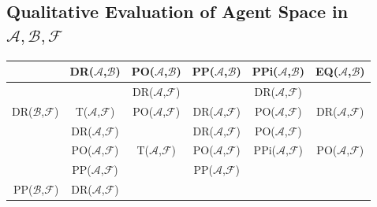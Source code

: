 \documentclass[runningheads]{llncs}
\newcommand{\assertionRegion}{\mathcal{A}}
\newcommand{\beliefRegion}{\mathcal{B}}
\newcommand{\factRegion}{\mathcal{F}}
\newcommand{\abf}{\assertionRegion,\beliefRegion,\factRegion}
\newcommand{\eq}[2]{EQ(#1,#2)}
\newcommand{\pp}[2]{PP(#1,#2)}
\newcommand{\po}[2]{PO(#1,#2)}
\newcommand{\ppi}[2]{PPi(#1,#2)}
\newcommand{\dr}[2]{DR(#1,#2)}
\newcommand{\all}[2]{T(#1,#2)}
\begin{document}
\subsection{Qualitative Evaluation of Agent Space in $\abf$}\label{sec:agentspace}
\begin{table}[t]
\centering
\begin{adjustbox}{width=.6\columnwidth}
\begin{tabular}{r||c|c|c|c|c} 
& \dr{$\assertionRegion$}{$\beliefRegion$} & 
	\po{$\assertionRegion$}{$\beliefRegion$}& 
	\pp{$\assertionRegion$}{$\beliefRegion$} &
	\ppi{$\assertionRegion$}{$\beliefRegion$} & 
	\eq{$\assertionRegion$}{$\beliefRegion$} \\
\hline
\hline %
 \multirow{3}{*}{\dr{$\beliefRegion$}{$\factRegion$}} & 
	\cellcolor{abfred} & %
	\cellcolor{abf-rg-1}\dr{$\assertionRegion$}{$\factRegion$} & %
	\cellcolor{abf-rg-2}\multirow{3}{*}{\dr{$\assertionRegion$}{$\factRegion$}} & %
	\cellcolor{abf-rg-3} \dr{$\assertionRegion$}{$\factRegion$}& %
	 \cellcolor{abf-rg-4} \\ %
& \cellcolor{abfred}\all{$\assertionRegion$}{$\factRegion$}& %
	\cellcolor{abf-rg-1}\po{$\assertionRegion$}{$\factRegion$} & %
	\cellcolor{abf-rg-2}\dr{$\assertionRegion$}{$\factRegion$} & %
	\cellcolor{abf-rg-3}\po{$\assertionRegion$}{$\factRegion$} & %
	\cellcolor{abf-rg-4}\dr{$\assertionRegion$}{$\factRegion$}\\ %
\hline %
 \multirow{3}{*}{\po{$\beliefRegion$}{$\factRegion$}} &
	\cellcolor{abf-rg-1}\dr{$\assertionRegion$}{$\factRegion$} & %
	\cellcolor{abf-rg-2} & %
	\cellcolor{abf-rg-3}\dr{$\assertionRegion$}{$\factRegion$} & %
	\cellcolor{abf-rg-4}\po{$\assertionRegion$}{$\factRegion$} & %
	\cellcolor{abf-rg-5} \\ %
 & \cellcolor{abf-rg-1}\po{$\assertionRegion$}{$\factRegion$} & %
	\cellcolor{abf-rg-2} \all{$\assertionRegion$}{$\factRegion$} & %
	\cellcolor{abf-rg-3}\po{$\assertionRegion$}{$\factRegion$} & %
	\cellcolor{abf-rg-4}\ppi{$\assertionRegion$}{$\factRegion$} & %
	\cellcolor{abf-rg-5} \po{$\assertionRegion$}{$\factRegion$}\\%
 & \cellcolor{abf-rg-1}\pp{$\assertionRegion$}{$\factRegion$} & %
	\cellcolor{abf-rg-2} &  %
	\cellcolor{abf-rg-3}\pp{$\assertionRegion$}{$\factRegion$} & %
	\cellcolor{abf-rg-4}& %
	\cellcolor{abf-rg-5}\\ %
\hline %
 \multirow{4}{*}{\pp{$\beliefRegion$}{$\factRegion$}} &
	\cellcolor{abf-rg-2}\dr{$\assertionRegion$}{$\factRegion$} & 

\end{tabular}
\end{adjustbox}
\end{table}
\end{document}
